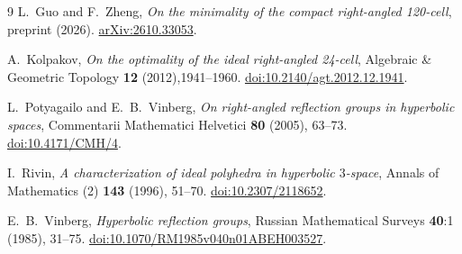 \documentclass[11pt]{article}
\theoremstyle{remark}
\begin{document}
\begin{thebibliography}{9}
L.~Guo and F.~Zheng, \emph{On the minimality of the compact
right-angled 120-cell}, preprint (2026).
\href{https://arxiv.org/abs/2610.33053}{arXiv:2610.33053}.

A.~Kolpakov, \emph{On the optimality of the ideal right-angled 24-cell},
Algebraic \& Geometric Topology \textbf{12} (2012),1941--1960.
\href{https://doi.org/10.2140/agt.2012.12.1941}{doi:10.2140/agt.2012.12.1941}.

L.~Potyagailo and E.~B.~Vinberg, \emph{On right-angled reflection
groups in hyperbolic spaces}, Commentarii Mathematici Helvetici
\textbf{80} (2005), 63--73.
\href{https://doi.org/10.4171/CMH/4}{doi:10.4171/CMH/4}.

I.~Rivin, \emph{A characterization of ideal polyhedra in hyperbolic
$3$-space}, Annals of Mathematics (2) \textbf{143} (1996), 51--70.
\href{https://doi.org/10.2307/2118652}{doi:10.2307/2118652}.

E.~B.~Vinberg, \emph{Hyperbolic reflection groups}, Russian
Mathematical Surveys \textbf{40}:1 (1985), 31--75.
\href{https://doi.org/10.1070/RM1985v040n01ABEH003527}{doi:10.1070/RM1985v040n01ABEH003527}.
\end{thebibliography}
\end{document}
